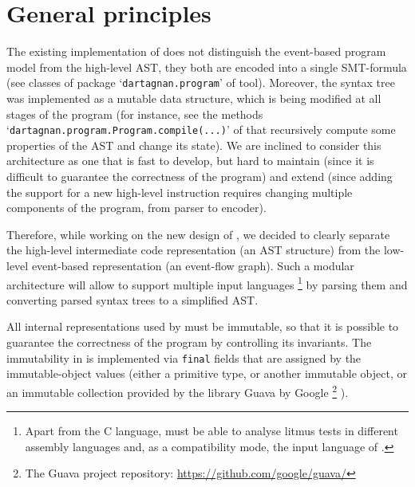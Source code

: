 

\section{General principles}
\label{ch:impl:principles}

The existing implementation of \porthos{} does not distinguish the event-based program model from the high-level AST, they both are encoded into a single SMT-formula (see classes of package `\texttt{dartagnan.program}' of \porthos{} tool).
Moreover, the syntax tree was implemented as a mutable data structure, which is being modified at all stages of the program (for instance, see the methods `\texttt{dartagnan.program.Program.compile(...)}' of \porthos{} that recursively compute some properties of the AST and change its state).
We are inclined to consider this architecture as one that is fast to develop, but hard to maintain (since it is difficult to guarantee the correctness of the program) and extend (since adding the support for a new high-level instruction requires changing multiple components of the program, from parser to encoder).

Therefore, while working on the new design of \porthos[2], we decided to clearly separate the high-level intermediate code representation (an AST structure) from the low-level event-based representation (an event-flow graph).
Such a modular architecture will allow to support multiple input languages%
%
\footnote{Apart from the C language, \porthos[2] must be able to analyse litmus tests in different assembly languages and, as a compatibility mode, the input language of \porthos[1].} %
%
by parsing them and converting parsed syntax trees to a simplified AST.

All internal representations used by \porthos[2] must be immutable, so that it is possible to guarantee the correctness of the program by controlling its invariants.
The immutability in \porthos[2] is implemented via \texttt{final} fields that are assigned by the immutable-object values (either a primitive type, or another immutable object, or an immutable collection provided by the library Guava by Google%
%
\footnote{The Guava project repository: \url{https://github.com/google/guava/}}%
%
).

